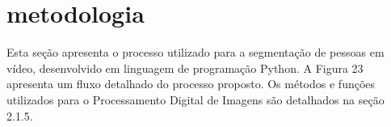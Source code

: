 \documentclass[12pt,oneside,a4paper,chapter=TITLE,section=TITLE,sumario=tradicional]{abntex2}
\begin{document}
\section{metodologia}
Esta seção apresenta o processo utilizado para a segmentação de pessoas em vídeo, desenvolvido em linguagem de programação Python. A Figura 23 apresenta um fluxo detalhado do processo proposto. Os métodos e funções utilizados para o Processamento Digital de Imagens são detalhados na seção 2.1.5.

\begin{figure}[htb]
\end{figure}





\end{document}
